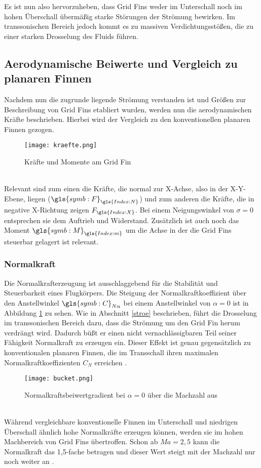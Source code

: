 Es ist nun also hervorzuheben, dass Grid Fins weder im Unterschall noch im hohen Überschall übermäßig starke Störungen der Strömung bewirken. Im transsonischen Bereich jedoch kommt es zu massiven Verdichtungsstößen, die zu einer starken Drosselung des Fluids führen.


\subsection{Aerodynamische Beiwerte und Vergleich zu planaren Finnen}
Nachdem nun die zugrunde liegende Strömung verstanden ist und Größen zur Beschreibung von Grid Fins etabliert wurden, werden nun die aerodynamischen Kräfte beschrieben. Hierbei wird der Vergleich zu den konventionellen planaren Finnen gezogen.
\begin{figure}[h]
	\centering
	\texttt{[image: kraefte.png]}
	\caption{Kräfte und Momente am Grid Fin}
\end{figure}\\
Relevant sind zum einen die Kräfte, die normal zur X-Achse, also in der X-Y-Ebene, liegen ($\gls{symb:F}_{\gls{Index:N}}$) und zum anderen die Kräfte, die in negative X-Richtung zeigen $F_{\gls{Index:X}}$. Bei einem Neigungswinkel von $\sigma = 0$ entsprechen sie dem Auftrieb und Widerstand. Zusätzlich ist auch noch das Moment $\gls{symb:M}_{\gls{Index:m}}$ um die Achse in der die Grid Fins steuerbar gelagert ist relevant.
\subsubsection{Normalkraft}
Die Normalkrafterzeugung ist ausschlaggebend für die Stabilität und Steuerbarkeit eines Flugkörpers. Die Steigung der Normalkraftkoeffizient über den Anstellwinkel $\gls{symb:C}_{N\alpha}$ bei einem Anstellwinkel von $\alpha = 0$ ist in Abbildung \ref{abb_bucket} zu sehen. Wie in Abschnitt \ref{stroe} beschrieben, führt die Drosselung im transsonischen Bereich dazu, dass die Strömung um den Grid Fin herum verdrängt wird. Dadurch büßt er einen nicht vernachlässigbaren Teil seiner Fähigkeit Normalkraft zu erzeugen ein. Dieser Effekt ist genau gegensätzlich zu konventionalen planaren Finnen, die im Transschall ihren maximalen Normalkraftkoeffizienten $C_N$ erreichen \cite{synopsis}.
\begin{figure}[h]
	\centering
	\texttt{[image: bucket.png]}
	\caption{Normalkraftsbeiwertgradient bei $\alpha = 0$ über die Machzahl aus \cite{synopsis}}
	\label{abb_bucket}
\end{figure}\\
Während vergleichbare konventionelle Finnen im Unterschall und niedrigen Überschall ähnlich hohe Normalkräfte erzeugen können, werden sie im hohen Machbereich von Grid Fins übertroffen. Schon ab $Ma=2,5$ kann die Normalkraft das 1,5-fache betragen und dieser Wert steigt mit der Machzahl nur noch weiter an \cite{synopsis,vergleichPlanarNATO}.
